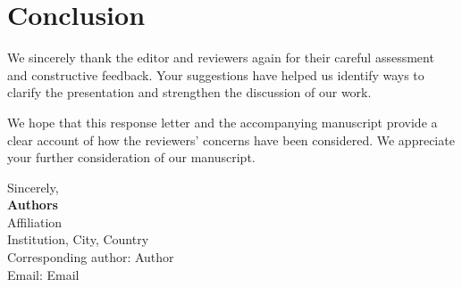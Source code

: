 \documentclass[11pt,a4paper]{article}
\makeatletter
\let\responseplainbibitem\@bibitem
\let\responseplainlbibitem\@lbibitem
\newcounter{reviewer}
\newcommand{\writeresponsebibliography}{\begingroup\let\BR@bib\let\@bibitem\responseplainbibitem\let\@lbibitem\responseplainlbibitem\nobibliography{ref}\endgroup}
\newif\ifresponsedocumentcited
\makeatother
\begin{document}
\newpage
\section*{Conclusion}
We sincerely thank the editor and reviewers again for their careful assessment and constructive feedback. Your suggestions have helped us identify ways to clarify the presentation and strengthen the discussion of our work.

We hope that this response letter and the accompanying manuscript provide a clear account of how the reviewers' concerns have been considered. We appreciate your further consideration of our manuscript.

\vspace{1em}
\noindent
Sincerely,\\[4pt]
\textbf{Authors}\\[4pt]
Affiliation\\
Institution, City, Country\\
Corresponding author: Author\\
Email: Email

\ifresponsedocumentcited
    
    \writeresponsebibliography
\fi
\end{document}
